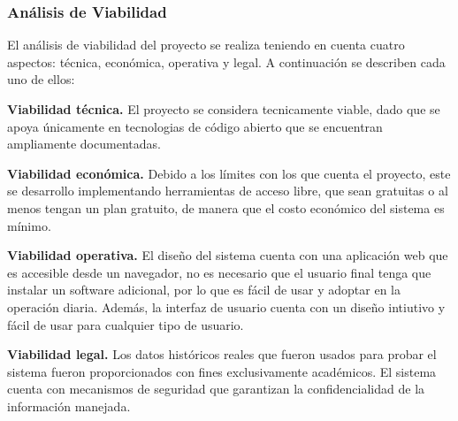 \subsubsection{Análisis de Viabilidad}
El análisis de viabilidad del proyecto se realiza teniendo en cuenta cuatro aspectos: técnica, económica, operativa y legal. A continuación se describen cada uno de ellos:

\textbf{Viabilidad técnica.} El proyecto se considera tecnicamente viable, dado que se apoya únicamente en tecnologias de código abierto que se encuentran ampliamente documentadas.

\textbf{Viabilidad económica.} Debido a los límites con los que cuenta el proyecto, este se desarrollo implementando herramientas de acceso libre, que sean gratuitas o al menos tengan un plan gratuito, de manera que el costo económico del sistema es mínimo.

\textbf{Viabilidad operativa.} El diseño del sistema cuenta con una aplicación web que es accesible desde un navegador, no es necesario que el usuario final tenga que instalar un software adicional, por lo que es fácil de usar y adoptar en la operación diaria. Además, la interfaz de usuario cuenta con un diseño intiutivo y fácil de usar para cualquier tipo de usuario.

\textbf{Viabilidad legal.} Los datos históricos reales que fueron usados para probar el sistema fueron proporcionados con fines exclusivamente académicos. El sistema cuenta con mecanismos de seguridad que garantizan la confidencialidad de la información manejada.